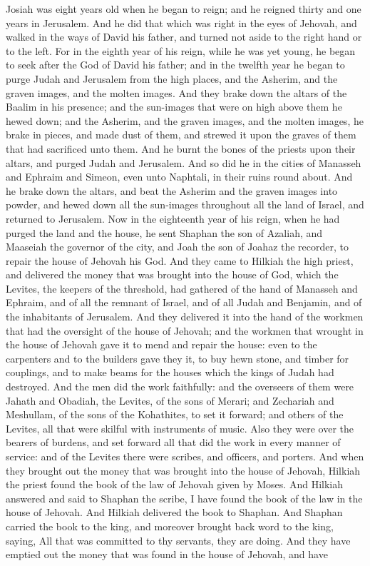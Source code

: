 Josiah was eight years old when he began to reign; and he reigned thirty and one years in Jerusalem. And he did that which was right in the eyes of Jehovah, and walked in the ways of David his father, and turned not aside to the right hand or to the left. For in the eighth year of his reign, while he was yet young, he began to seek after the God of David his father; and in the twelfth year he began to purge Judah and Jerusalem from the high places, and the Asherim, and the graven images, and the molten images. And they brake down the altars of the Baalim in his presence; and the sun-images that were on high above them he hewed down; and the Asherim, and the graven images, and the molten images, he brake in pieces, and made dust of them, and strewed it upon the graves of them that had sacrificed unto them. And he burnt the bones of the priests upon their altars, and purged Judah and Jerusalem. And so did he in the cities of Manasseh and Ephraim and Simeon, even unto Naphtali, in their ruins round about. And he brake down the altars, and beat the Asherim and the graven images into powder, and hewed down all the sun-images throughout all the land of Israel, and returned to Jerusalem.  Now in the eighteenth year of his reign, when he had purged the land and the house, he sent Shaphan the son of Azaliah, and Maaseiah the governor of the city, and Joah the son of Joahaz the recorder, to repair the house of Jehovah his God. And they came to Hilkiah the high priest, and delivered the money that was brought into the house of God, which the Levites, the keepers of the threshold, had gathered of the hand of Manasseh and Ephraim, and of all the remnant of Israel, and of all Judah and Benjamin, and of the inhabitants of Jerusalem. And they delivered it into the hand of the workmen that had the oversight of the house of Jehovah; and the workmen that wrought in the house of Jehovah gave it to mend and repair the house: even to the carpenters and to the builders gave they it, to buy hewn stone, and timber for couplings, and to make beams for the houses which the kings of Judah had destroyed. And the men did the work faithfully: and the overseers of them were Jahath and Obadiah, the Levites, of the sons of Merari; and Zechariah and Meshullam, of the sons of the Kohathites, to set it forward; and others of the Levites, all that were skilful with instruments of music. Also they were over the bearers of burdens, and set forward all that did the work in every manner of service: and of the Levites there were scribes, and officers, and porters.  And when they brought out the money that was brought into the house of Jehovah, Hilkiah the priest found the book of the law of Jehovah given by Moses. And Hilkiah answered and said to Shaphan the scribe, I have found the book of the law in the house of Jehovah. And Hilkiah delivered the book to Shaphan. And Shaphan carried the book to the king, and moreover brought back word to the king, saying, All that was committed to thy servants, they are doing. And they have emptied out the money that was found in the house of Jehovah, and have 
